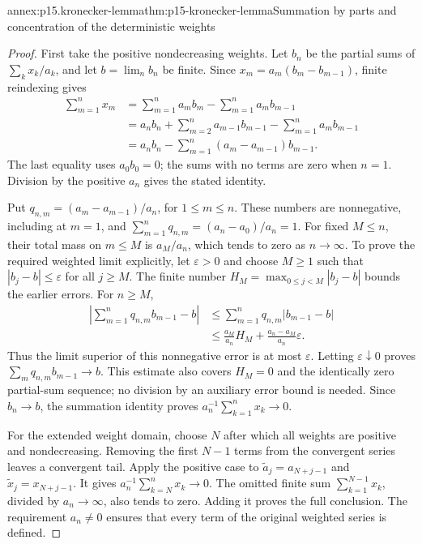 \begin{annexitem}{annex:p15.kronecker-lemma}{thm:p15-kronecker-lemma}{Summation by parts and concentration of the deterministic weights}
\begin{proof}
First take the positive nondecreasing weights. Let \(b_n\) be the
partial sums of \(\sum_kx_k/a_k\), and let \(b=\lim_nb_n\)
be finite. Since \(x_m=a_m(b_m-b_{m-1})\), finite reindexing gives
\[
 \begin{aligned}
 \sum_{m=1}^nx_m
  &=\sum_{m=1}^na_mb_m-\sum_{m=1}^na_mb_{m-1}\\
  &=a_nb_n+\sum_{m=2}^na_{m-1}b_{m-1}
                                  -\sum_{m=1}^na_mb_{m-1}\\
  &=a_nb_n-\sum_{m=1}^n(a_m-a_{m-1})b_{m-1}.
 \end{aligned}
\]
The last equality uses \(a_0b_0=0\); the sums with no terms
are zero when \(n=1\). Division by the positive \(a_n\) gives
the stated identity.

Put \(q_{n,m}=(a_m-a_{m-1})/a_n\), for \(1\leq m\leq n\).
These numbers are nonnegative, including at \(m=1\), and
\(\sum_{m=1}^nq_{n,m}=(a_n-a_0)/a_n=1\).
For fixed \(M\leq n\), their total mass on \(m\leq M\)
is \(a_M/a_n\), which tends to zero as \(n\to\infty\).
To prove the required weighted limit explicitly, let \(\varepsilon>0\)
and choose \(M\geq1\) such that \(|b_j-b|\leq\varepsilon\)
for all \(j\geq M\). The finite number
\(H_M=\max_{0\leq j<M}|b_j-b|\) bounds the earlier errors.
For \(n\geq M\),
\[
 \begin{aligned}
 \left|\sum_{m=1}^nq_{n,m}b_{m-1}-b\right|
 &\leq\sum_{m=1}^nq_{n,m}|b_{m-1}-b|\\
 &\leq\frac{a_M}{a_n}H_M
             +\frac{a_n-a_M}{a_n}\varepsilon.
 \end{aligned}
\]
Thus the limit superior of this nonnegative error is at most
\(\varepsilon\). Letting \(\varepsilon\downarrow0\) proves
\(\sum_mq_{n,m}b_{m-1}\to b\). This estimate also covers
\(H_M=0\) and the identically zero partial-sum sequence; no division
by an auxiliary error bound is needed. Since \(b_n\to b\),
the summation identity proves \(a_n^{-1}\sum_{k=1}^nx_k\to0\).

For the extended weight domain, choose \(N\) after which all weights
are positive and nondecreasing. Removing the first \(N-1\) terms
from the convergent series leaves a convergent tail. Apply the positive
case to \(\widetilde a_j=a_{N+j-1}\) and
\(\widetilde x_j=x_{N+j-1}\). It gives
\(a_n^{-1}\sum_{k=N}^nx_k\to0\). The omitted finite sum
\(\sum_{k=1}^{N-1}x_k\), divided by \(a_n\to\infty\), also
tends to zero. Adding it proves the full conclusion. The requirement
\(a_n\ne0\) ensures that every term of the original weighted series
is defined.
\end{proof}
\end{annexitem}

